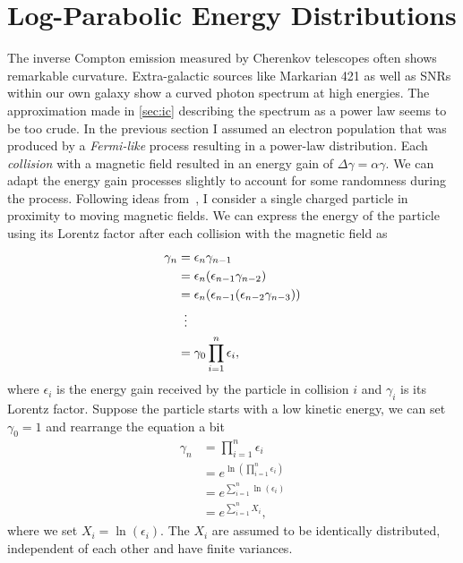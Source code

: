 \section{Log-Parabolic Energy Distributions}
\label{sec:log-par-he}
The inverse Compton emission measured by Cherenkov telescopes often shows remarkable curvature. 
Extra-galactic sources like Markarian 421 as well as SNRs within our own galaxy show a curved photon spectrum at high energies.
The approximation made in \cref{sec:ic} describing the spectrum as a power law seems to be too crude.
In the previous section I assumed an electron population that was produced by a \emph{Fermi-like}
process resulting in a power-law distribution. Each \emph{collision} with a magnetic field resulted in an energy gain of 
$\Delta \gamma = \alpha \gamma$. We can adapt the energy gain processes slightly to account for some randomness 
during the process. 
Following ideas from~\cite{acceleration_tramacere}, I consider a single charged particle in proximity to moving magnetic fields.
We can express the energy of the particle using its Lorentz factor after each collision with the magnetic field  as
\begin{align*}
  \gamma_n & = \epsilon_n \gamma_{n-1} \\
           & = \epsilon_n (\epsilon_{n-1} \gamma_{n-2})\\
           & = \epsilon_n (\epsilon_{n-1} (\epsilon_{n-2} \gamma_{n-3})) \\ 
           &\setbox0\hbox{=}\mathrel{\makebox[\wd0]{\hfil\vdots\hfil}} \\ %
           & = \gamma_0 \prod_{i=1}^n \epsilon_{i},
\end{align*}
where $\epsilon_i$ is the energy gain received by the particle in collision $i$ and $\gamma_i$ is its Lorentz factor.
Suppose the particle starts with a low kinetic energy, we can set $\gamma_0 = 1$ and rearrange the equation a bit
\begin{align*}
  \gamma_n  & = \prod_{i=1}^n \epsilon_{i} \\
            & = e^{\ln(\prod_{i=1}^n \epsilon_{i})} \\
            & = e^{\sum_{i=1}^n \ln(\epsilon_{i})} \\
            & = e^{\sum_{i=1}^n X_i},
\end{align*}
where we set $X_i = \ln(\epsilon_{i})$. The $X_i$ are assumed to be identically distributed,
independent of each other and have finite variances.
